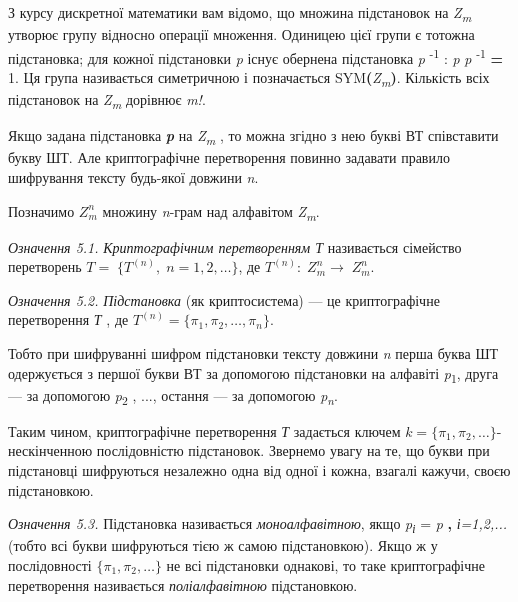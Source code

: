 З курсу дискретної математики вам відомо, що множина підстановок на
\textit{Z}\textit{\textsubscript{m}}\textsubscript{ } утворює групу відносно
операції множення. Одиницею цієї групи є тотожна підстановка; для кожної
підстановки \textit{\textgreek{p}}\textbf{ } існує обернена підстановка
\textit{\textgreek{p}}\textit{ }\textsuperscript{{}-1} :
\textit{\textgreek{p}}\textsf{\textit{ }}\textit{\textgreek{p}}
\textsuperscript{{}-1}\textbf{ = }1. Ця група називається симетричною і
позначається SYM\textbf{(}\textit{Z}\textit{\textsubscript{m}}\textbf{)}.
Кількість всіх підстановок на
\textit{Z}\textit{\textsubscript{m}}\textsubscript{ } дорівнює
\textit{m}\textit{!}.

Якщо задана підстановка \textbf{\textit{\textgreek{p}}}\textbf{\textit{ }} на
\textit{Z}\textit{\textsubscript{m}}\textsubscript{ }, то можна згідно з нею
букві ВТ  співставити букву ШТ. Але криптографічне перетворення повинно
задавати правило шифрування тексту будь-якої довжини \textit{n}.

Позначимо  $Z_{m}^n$ множину \textit{n}{}-грам над алфавітом
\textit{Z}\textit{\textsubscript{m}}.

\textit{Означення 5.1.}\textit{ Криптографічним перетворенням Т }називається
сімейство перетворень  $T=\;\{T^{(n)},\;n=1,2,\dots\}$,
де  $T^{(n)}:\;Z_{m}^{n}\rightarrow \;Z_{m}^n$\textsf{.}

\textit{Означення 5.2.}\textit{ Підстановка}\textbf{\textit{ }}(як
криптосистема) --- це криптографічне перетворення \textit{Т}\textbf{\textit{ }},
де  ${T^{(n)}=\{\pi _{1},\pi _{2},\dots,\pi
_{n}\}}$.

Тобто при шифруванні шифром підстановки тексту довжини \textit{n} перша буква ШТ
одержується з першої букви ВТ за допомогою підстановки на алфавіті
\textit{\textgreek{p}}\textsubscript{1}, друга --- за допомогою
\textit{\textgreek{p}}\textsubscript{2 }, ..., остання --- за допомогою
\textit{\textgreek{p}}\textit{\textsubscript{n}}.

Таким чином, криптографічне перетворення \textit{Т} задається ключем  ${k=\{\pi
_{1},\pi _{2},\dots\}}${}- нескінченною послідовністю
підстановок. Звернемо увагу на те, що букви при підстановці шифруються
незалежно одна від одної і кожна, взагалі кажучи, своєю підстановкою.

\textit{Означення 5.3.}\textit{ }Підстановка називається
\textit{моноалфавітною}, якщо\textbf{
}\textit{\textgreek{p}}\textit{\textsubscript{і}} =\textsf{\textit{
}}\textit{\textgreek{p}}\textbf{ , }\textit{і=1,2,...} (тобто всі букви
шифруються тією ж самою підстановкою). Якщо ж у послідовності   ${\{\pi
_{1},\pi _{2},\dots\}}$ не всі підстановки однакові, то
таке криптографічне перетворення називається \textit{поліалфавітною}
підстановкою.

